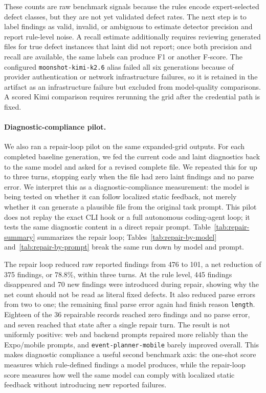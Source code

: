 \documentclass[11pt]{article}
\begin{document}
These counts are raw benchmark signals because the rules encode expert-selected defect classes, but they are not yet validated defect rates. The next step is to label findings as valid, invalid, or ambiguous to estimate detector precision and report rule-level noise. A recall estimate additionally requires reviewing generated files for true defect instances that laint did not report; once both precision and recall are available, the same labels can produce F1 or another F-score. The configured \texttt{moonshot-kimi-k2.6} alias failed all six generations because of provider authentication or network infrastructure failures, so it is retained in the artifact as an infrastructure failure but excluded from model-quality comparisons. A scored Kimi comparison requires rerunning the grid after the credential path is fixed.

\paragraph{Diagnostic-compliance pilot.}
We also ran a repair-loop pilot on the same expanded-grid outputs. For each completed baseline generation, we fed the current code and laint diagnostics back to the same model and asked for a revised complete file. We repeated this for up to three turns, stopping early when the file had zero laint findings and no parse error. We interpret this as a diagnostic-compliance measurement: the model is being tested on whether it can follow localized static feedback, not merely whether it can generate a plausible file from the original task prompt. This pilot does not replay the exact CLI hook or a full autonomous coding-agent loop; it tests the same diagnostic content in a direct repair prompt. Table~\ref{tab:repair-summary} summarizes the repair loop; Tables~\ref{tab:repair-by-model} and~\ref{tab:repair-by-prompt} break the same run down by model and prompt.



The repair loop reduced raw reported findings from 476 to 101, a net reduction of 375 findings, or 78.8\%, within three turns. At the rule level, 445 findings disappeared and 70 new findings were introduced during repair, showing why the net count should not be read as literal fixed defects. It also reduced parse errors from two to one; the remaining final parse error again had finish reason \texttt{length}. Eighteen of the 36 repairable records reached zero findings and no parse error, and seven reached that state after a single repair turn. The result is not uniformly positive: web and backend prompts repaired more reliably than the Expo/mobile prompts, and \texttt{event-planner-mobile} barely improved overall. This makes diagnostic compliance a useful second benchmark axis: the one-shot score measures which rule-defined findings a model produces, while the repair-loop score measures how well the same model can comply with localized static feedback without introducing new reported failures.
\end{document}
